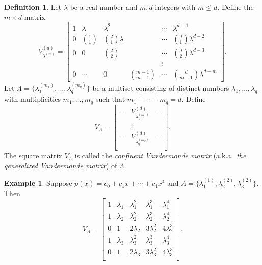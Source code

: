 \documentclass{article}
\theoremstyle{definition}
\newtheorem{definition}[theorem]{Definition}
\newtheorem{example}[theorem]{Example}
\begin{document}
\begin{definition}
\label{def:vlamd}
Let $\lambda$ be a real number and $m,d$ integers with $m \leq d$.  Define the $m\times d$ matrix 
\[
    V_{\lambda^{(m)}}^{(d)} = 
    \begin{bmatrix}
        1 & \lambda & \lambda^2 & ~ & \cdots & \lambda^{d-1} \\
        0 & \binom{1}{1} & \binom{2}{1}\lambda & ~ & \cdots & \binom{d}{1}\lambda^{d-2} \\
        0 & 0 & \binom{2}{2} & ~ & \cdots & \binom{d}{2}\lambda^{d-3} \\
        ~ & ~ & ~ & ~ & \vdots & ~ \\
        0 & \cdots & 0 & \binom{m-1}{m-1} & \cdots & \binom{d}{m-1}\lambda^{d-m}
    \end{bmatrix}.
\]
Let $\Lambda = \{\lambda_1^{(m_1)}, \ldots, \lambda_q^{(m_q)}\}$ be a multiset consisting of distinct
numbers $\lambda_1, \dots, \lambda_q$ with multiplicities $m_1, \dots, m_q$ such that
$m_1 + \cdots + m_q = d$.  Define 
\[
    V_\Lambda = 
    \begin{bmatrix}
        - & V_{\lambda_1^{(m_1)}}^{(d)} & - \\
         & \vdots & \\
        - & V_{\lambda_q^{(m_q)}}^{(d)} & - \\
    \end{bmatrix}.
\]
The square matrix $V_\Lambda$ is called 
the \emph{confluent Vandermonde matrix} (a.k.a.\ \emph{the generalized Vandermonde matrix})
of $\Lambda$.  
\end{definition}

\begin{example} \label{basic-example}
Suppose $p(x) = c_0+c_1x + \cdots + c_4x^4$ and 
$\Lambda = \{\lambda_1^{(1)}, \lambda_2^{(2)}, \lambda_3^{(2)}\}$. Then 
$$V_\Lambda = \begin{bmatrix}
1 & \lambda_1 & \lambda_1^2 & \lambda_1^3& \lambda_1^{4} \\
1 & \lambda_2 & \lambda_2^2 & \lambda_2^3& \lambda_2^{4} \\
0 & 1 & 2 \lambda_2 & 3\lambda_2^2 & 4\lambda_2^3  \\
1 & \lambda_3 & \lambda_3^2 & \lambda_3^3 &  \lambda_3^{4} \\
0 & 1 & 2 \lambda_3 & 3\lambda_3^2 & 4\lambda_3^3  \\
\end{bmatrix}.$$
\end{example}
\end{document}
